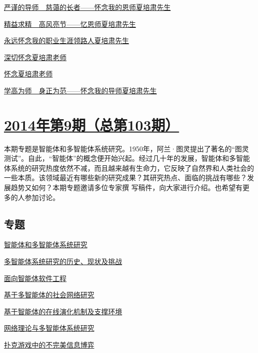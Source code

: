 \documentclass[a4paper]{article}
\begin{document}
\href{http://history.ccf.org.cn/resources/1190201776262/2014/10/13/4.pdf}{严谨的导师　慈蔼的长者——怀念我的恩师夏培肃先生}

\href{http://history.ccf.org.cn/resources/1190201776262/2014/10/13/5.pdf}{精益求精　高风亮节——忆恩师夏培肃先生}

\href{http://history.ccf.org.cn/resources/1190201776262/2014/10/13/7.pdf}{永远怀念我的职业生涯领路人夏培肃先生}

\href{http://history.ccf.org.cn/resources/1190201776262/2014/10/13/1.pdf}{深切怀念夏培肃老师}

\href{http://history.ccf.org.cn/resources/1190201776262/2014/10/13/3.pdf}{怀念夏培肃老师}

\href{http://history.ccf.org.cn/resources/1190201776262/2014/10/13/6.pdf}{学高为师　身正为范——怀念我的导师夏培肃先生}


\section{\href{http://history.ccf.org.cn/sites/ccf/jsjtbbd.jsp?contentId=2820931243508}{\textbf{2014年第9期（总第103期）}}}
本期专题是智能体和多智能体系统研究。1950年，阿兰·图灵提出了著名的“图灵测试”。自此，“智能体”的概念便开始兴起。经过几十年的发展，智能体和多智能体系统的研究热度依然不减，而且越来越有生命力，它反映了自然界和人类社会的一些本质。该领域最近有哪些新的研究成果？其研究热点、面临的挑战有哪些？发展趋势又如何？本期专题邀请多位专家撰
写稿件，向大家进行介绍。也希望有更多的人参加讨论。
\subsection{专题}
\href{http://history.ccf.org.cn/resources/1190201776262/2014/09/12/1.pdf}{智能体和多智能体系统研究}

\href{http://history.ccf.org.cn/resources/1190201776262/2014/09/12/2.pdf}{多智能体系统研究的历史、现状及挑战}

\href{http://history.ccf.org.cn/resources/1190201776262/2014/09/12/3.pdf}{面向智能体软件工程}

\href{http://history.ccf.org.cn/resources/1190201776262/2014/09/15/6.pdf}{基于多智能体的社会网络研究}

\href{http://history.ccf.org.cn/resources/1190201776262/2014/09/15/4.pdf}{基于智能体的在线演化机制及支撑环境}

\href{http://history.ccf.org.cn/resources/1190201776262/2014/09/15/5.pdf}{网络理论与多智能体系统研究}

\href{http://history.ccf.org.cn/resources/1190201776262/2014/09/15/7.pdf}{扑克游戏中的不完美信息博弈}
\end{document}
